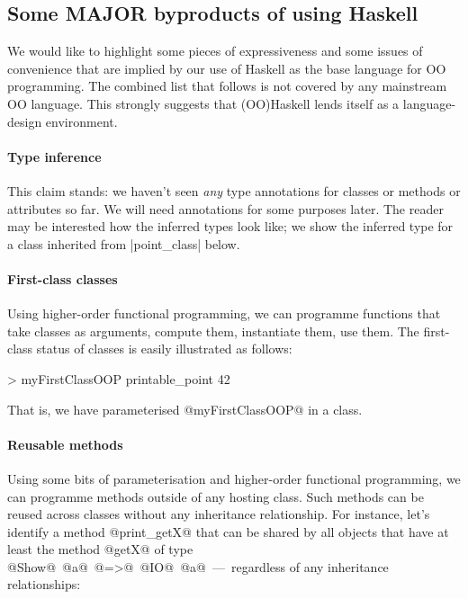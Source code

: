 \subsection{Some MAJOR byproducts of using Haskell}

We would like to highlight some pieces of expressiveness and some
issues of convenience that are implied by our use of Haskell as the
base language for OO programming. The combined list that follows is
not covered by any mainstream OO language. This strongly suggests that
(OO)Haskell lends itself as a language-design environment.



\paragraph*{Type inference}

This claim stands: we haven't seen \emph{any} type annotations for
classes or methods or attributes so far. We will need annotations for
some purposes later. The reader may be interested how the inferred
types look like; we show the inferred type for a class inherited from
|point_class| below.



\paragraph*{First-class classes}

Using higher-order functional programming, we can programme functions
that take classes as arguments, compute them, instantiate them, use
them. The first-class status of classes is easily illustrated as
follows:

\begin{code}
 > myFirstClassOOP printable_point
 42
\end{code}

\noindent
That is, we have parameterised @myFirstClassOOP@ in a class.



\paragraph*{Reusable methods}

Using some bits of parameterisation and higher-order functional
programming, we can programme methods outside of any hosting
class. Such methods can be reused across classes without any
inheritance relationship.  For instance, let's identify a method
@print_getX@ that can be shared by all objects that have at least the
method @getX@ of type @Show@~@a@~@=>@~@IO@~@a@~---~regardless of any
inheritance relationships:

